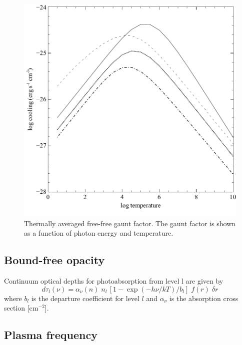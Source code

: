 \begin{figure}
\centering
\includegraphics[scale=0.8]{FreeFreeGauntFactors}
\caption[free-free gaunt factors]
{\label{fig:FreeFreeGauntFactors}Thermally averaged
free-free gaunt factor.  The gaunt factor is
shown as a function of photon energy and temperature.}
\end{figure}

\subsection{Bound-free opacity}

Continuum optical depths for photoabsorption from level l are given by
\begin{equation}
d{\tau _l}\left( \nu  \right) = {\alpha _\nu }\left( n
\right)\;{n_l}\,\left[ {1 - \exp \left( { - h\nu /kT} \right)/{b_l}}
\right]\;f(r)\;\delta r%
\end{equation}
where $b_l$ is the departure coefficient for level $l$ and $\alpha _\nu$ is the absorption
cross section [cm$^{-2}$].

\subsection{Plasma frequency}

